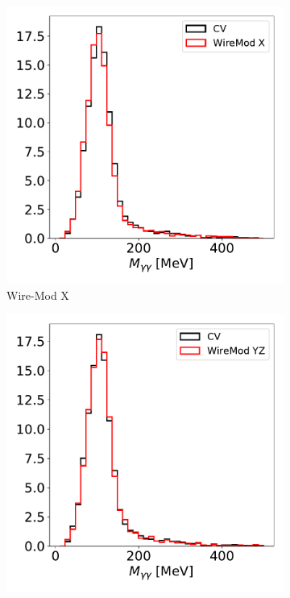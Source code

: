 \documentclass[a4paper]{article}
\begin{document}
\begin{figure}[H] 
\begin{center}
    \begin{subfigure}[b]{0.24\textwidth}
    \centering
    \includegraphics[width=1.00\textwidth]{detsys/pi0/pi0_mass_Y_03232020_WireMod_X.pdf}
    \caption{\label{fig:detsys:pi0mass:WMX}Wire-Mod X}
    \end{subfigure}
    \begin{subfigure}[b]{0.24\textwidth}
    \centering
    \includegraphics[width=1.00\textwidth]{detsys/pi0/pi0_mass_Y_03232020_WireMod_YZ.pdf}

\end{subfigure}
\end{center}
\end{figure}
\end{document}
